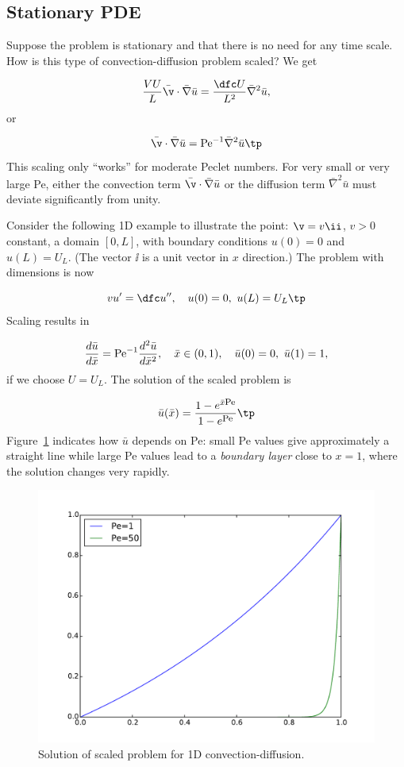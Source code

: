 \documentclass[graybox,envcountchap,sectrefs,final]{svmonodo}
\begin{document}
\subsection{Stationary PDE}

Suppose the problem is stationary and that there is no need for
any time scale. How is this type of convection-diffusion problem
scaled? We get

\[
\frac{VU}{L}\bar\v\cdot\bar\nabla\bar u =
\frac{\dfc U}{L^2}\bar\nabla^2\bar u,
\]
or

\begin{equation}
\bar\v\cdot\bar\nabla\bar u =
\hbox{Pe}^{-1}\bar\nabla^2\bar u\tp
\label{scale:convdiff:pde1:d3}
\end{equation}
This scaling only ``works'' for moderate Peclet numbers. For very small or
very large Pe, either the convection term $\bar\v\cdot\bar\nabla\bar u$
or the diffusion term $\bar\nabla^2\bar u$ must deviate significantly
from unity.

Consider the following 1D example to illustrate the point: $\v = v\ii$,
$v>0$ constant, a domain $[0,L]$, with boundary conditions $u(0)=0$ and
$u(L)=U_L$. (The vector $\ii$ is a unit vector in $x$ direction.)
The problem with dimensions is now

\[ vu^{\prime} = \dfc u^{\prime\prime},\quad u(0)=0,\ u(L)=U_L\tp\]
Scaling results in

\[ \frac{d\bar u}{d\bar x} = \hbox{Pe}^{-1}\frac{d^2\bar u}{d\bar x^2},\quad
\bar x\in (0,1),\quad \bar u(0)=0,\ \bar u(1) = 1,\]
if we choose $U=U_L$. The solution of the scaled problem is

\[ \bar u(\bar x) = \frac{1 - e^{\bar x\hbox{\footnotesize Pe}}}{1 - e^{\hbox{\footnotesize Pe}}}\tp\]
Figure~\ref{scale:convdiff:fig:scaled} indicates how $\bar u$ depends on
Pe: small Pe values give approximately a straight line while large Pe
values lead to a \emph{boundary layer} close to $x=1$, where the solution
changes very rapidly.


\begin{figure}[!ht]  %
  \centerline{\includegraphics[width=0.9\linewidth]{fig-scaling/boundary_layer1D.pdf}}
  \caption{
  Solution of scaled problem for 1D convection-diffusion. \label{scale:convdiff:fig:scaled}
  }
\end{figure}
\end{document}
